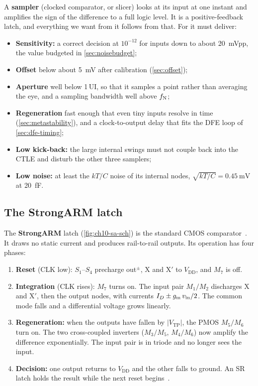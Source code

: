 A \textbf{sampler} (clocked comparator, or slicer) looks at its input at one instant and amplifies the sign of the difference to a full logic level. It is a positive-feedback latch, and everything we want from it follows from that. For \OS{} it must deliver:
\begin{itemize}
  \item \textbf{Sensitivity:} a correct decision at $10^{-12}$ for inputs down to about \qty{20}{\milli\volt}pp, the value budgeted in \cref{sec:noisebudget};
  \item \textbf{Offset} below about \qty{5}{\milli\volt} after calibration (\cref{sec:offset});
  \item \textbf{Aperture} well below 1\,UI, so that it samples a point rather than averaging the eye, and a sampling bandwidth well above $f_\mathrm{N}$;
  \item \textbf{Regeneration} fast enough that even tiny inputs resolve in time (\cref{sec:metastability}), and a clock-to-output delay that fits the DFE loop of \cref{sec:dfe-timing};
  \item \textbf{Low kick-back:} the large internal swings must not couple back into the CTLE and disturb the other three samplers;
  \item \textbf{Low noise:} at least the $kT/C$ noise of its internal nodes, $\sqrt{kT/C}=\qty{0.45}{\milli\volt}$ at \qty{20}{\femto\farad}.
\end{itemize}

\subsection{The StrongARM latch}

The \textbf{StrongARM} latch (\cref{fig:ch10-sa-sch}) is the standard CMOS comparator~\cite{p4:kobayashi1993,p4:razavi2015sa}. It draws no static current and produces rail-to-rail outputs. Its operation has four phases:
\begin{enumerate}
  \item \textbf{Reset} (CLK low): $S_1$--$S_4$ precharge out$^\pm$, X and X$'$ to $V_\mathrm{DD}$, and $M_7$ is off.
  \item \textbf{Integration} (CLK rises): $M_7$ turns on. The input pair $M_1/M_2$ discharges X and X$'$, then the output nodes, with currents $I_D\pm g_\mathrm{m}\,v_\mathrm{in}/2$. The common mode falls and a differential voltage grows linearly.
  \item \textbf{Regeneration:} when the outputs have fallen by $\lvert V_\mathrm{TP}\rvert$, the PMOS $M_5/M_6$ turn on. The two cross-coupled inverters ($M_3/M_5$, $M_4/M_6$) now amplify the difference exponentially. The input pair is in triode and no longer sees the input.
  \item \textbf{Decision:} one output returns to $V_\mathrm{DD}$ and the other falls to ground. An SR latch holds the result while the next reset begins~\cite{p4:nikolic2000}.
\end{enumerate}

